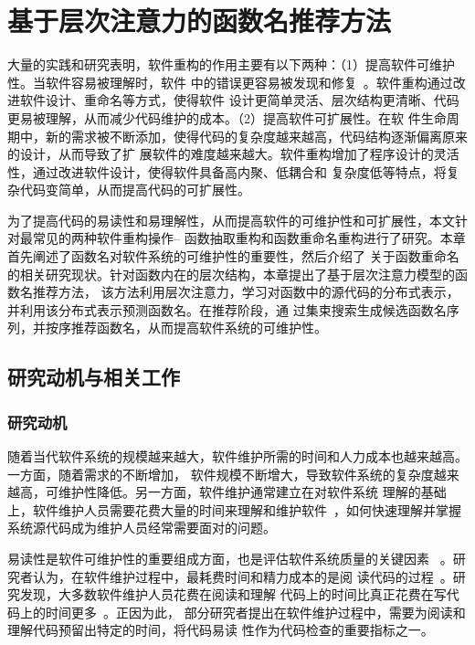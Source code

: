 
\chapter{基于层次注意力的函数名推荐方法}
大量的实践和研究表明，软件重构的作用主要有以下两种：（1）提高软件可维护性。当软件容易被理解时，软件
中的错误更容易被发现和修复~\cite{martin2009clean}。软件重构通过改进软件设计、重命名等方式，使得软件
设计更简单灵活、层次结构更清晰、代码更易被理解，从而减少代码维护的成本。（2）提高软件可扩展性。在软
件生命周期中，新的需求被不断添加，使得代码的复杂度越来越高，代码结构逐渐偏离原来的设计，从而导致了扩
展软件的难度越来越大。软件重构增加了程序设计的灵活性，通过改进软件设计，使得软件具备高内聚、低耦合和
复杂度低等特点，将复杂代码变简单，从而提高代码的可扩展性。

为了提高代码的易读性和易理解性，从而提高软件的可维护性和可扩展性，本文针对最常见的两种软件重构操作--
函数抽取重构和函数重命名重构进行了研究。本章首先阐述了函数名对软件系统的可维护性的重要性，然后介绍了
关于函数重命名的相关研究现状。针对函数内在的层次结构，本章提出了基于层次注意力模型的函数名推荐方法，
该方法利用层次注意力，学习对函数中的源代码的分布式表示，并利用该分布式表示预测函数名。在推荐阶段，通
过集束搜索生成候选函数名序列，并按序推荐函数名，从而提高软件系统的可维护性。

\section{研究动机与相关工作}
\subsection{研究动机}
随着当代软件系统的规模越来越大，软件维护所需的时间和人力成本也越来越高。一方面，随着需求的不断增加，
软件规模不断增大，导致软件系统的复杂度越来越高，可维护性降低。另一方面，软件维护通常建立在对软件系统
理解的基础上，软件维护人员需要花费大量的时间来理解和维护软件~\cite{Bansiya2002}，如何快速理解并掌握
系统源代码成为维护人员经常需要面对的问题。

易读性是软件可维护性的重要组成方面，也是评估软件系统质量的关键因素
~\cite{buse2008metric}。研究者认为，在软件维护过程中，最耗费时间和精力成本的是阅
读代码的过程~\cite{rugaber2000use}。研究发现，大多数软件维护人员花费在阅读和理解
代码上的时间比真正花费在写代码上的时间更多~\cite{ko2006exploratory}。正因为此，
部分研究者提出在软件维护过程中，需要为阅读和理解代码预留出特定的时间，将代码易读
性作为代码检查的重要指标之一。

